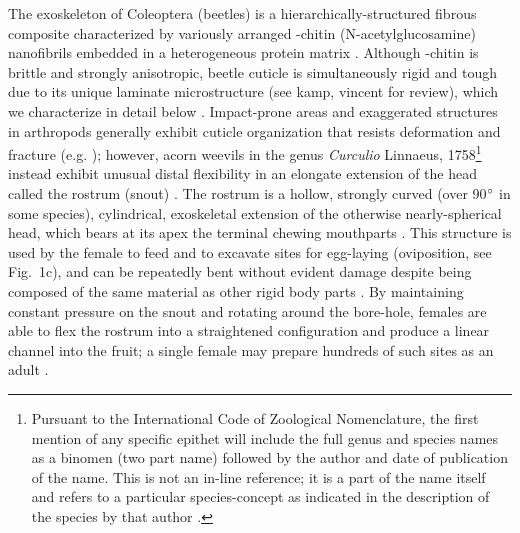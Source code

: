 \documentclass[twocolumn, linenumbers, superscriptaddress, nofootinbib]{revtex4-1}
\begin{document}
	{The exoskeleton of Coleoptera (beetles) is a hierarchically-structured fibrous composite characterized by variously arranged \textalpha-chitin (N-acetylglucosamine) nanofibrils embedded in a heterogeneous protein matrix \cite{Hepburn1973, Jansen2016, Vincent2004}.
	Although \textalpha-chitin is brittle and strongly anisotropic, beetle cuticle is simultaneously rigid and tough due to its unique laminate microstructure (see kamp, vincent for review), which we characterize in detail below \cite{Kamp2010, Kamp2015, Neville1976}.
	Impact-prone areas and exaggerated structures in arthropods generally exhibit cuticle organization that resists deformation and fracture (e.g. \cite{Amini2015, Mccullough2014mech, Mccullough2014struc, Dirks2012, Dirks2013}); however, acorn weevils in the genus \textit{Curculio} Linnaeus, 1758\footnote{
		Pursuant to the International Code of Zoological Nomenclature, the first mention of any specific epithet will include the full genus and species names as a binomen (two part name) followed by the author and date of publication of the name.
		This is not an in-line reference; it is a part of the name itself and refers to a particular species-concept as indicated in the description of the species by that author \cite{ICZN1999}.}
	instead exhibit unusual distal flexibility in an elongate extension of the head called the rostrum (snout) \cite{Toju2005, Jansen2016, Singh2016, Gibson1969}.
	The rostrum is a hollow, strongly curved (over 90$\degree$ in some species), cylindrical, exoskeletal extension of the otherwise nearly-spherical head, which bears at its apex the terminal chewing mouthparts \cite{Morimoto2003, Ting1933, Ting1936, Dennell1942, Gibson1969}.
	This structure is used by the female to feed and to excavate sites for egg-laying (oviposition, see Fig.~1c), and can be repeatedly bent without evident damage despite being composed of the same material as other rigid body parts \cite{Jansen2016, Singh2016, Gibson1969, Toju2005}.
	By maintaining constant pressure on the snout and rotating around the bore-hole, females are able to flex the rostrum into a straightened configuration and produce a linear channel into the fruit; a single female may prepare hundreds of such sites as an adult \cite{Toju2005, Moffett1989, AguirreUribe1978}.
	
}
\end{document}
